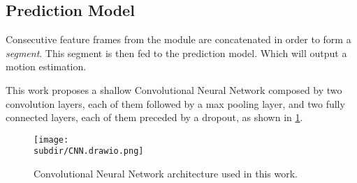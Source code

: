 \subsection{Prediction Model} \label{subsec:prediction-model}


Consecutive feature frames from the  module
are concatenated in order to form a \emph{segment}. This segment is then fed to
the prediction model. Which will output a motion estimation.

This work proposes a shallow Convolutional Neural Network \cite{FukushimaCNN}
composed by two convolution layers, each of them followed by a max pooling
layer, and two fully connected layers, each of them preceded by a dropout, as
shown in \cref{fig:model-arch-cnn}. 


\begin{figure}
    \centering
    \texttt{[image: \\subdir/CNN.drawio.png]}
    \caption{Convolutional Neural Network architecture used in this work.}
    \label{fig:model-arch-cnn}
\end{figure}






